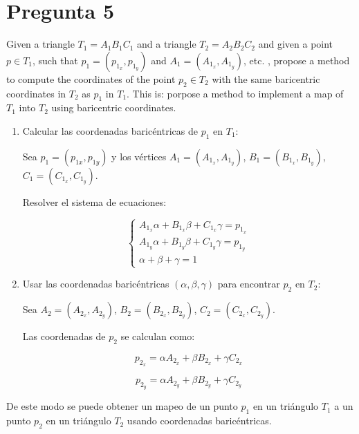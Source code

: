 \documentclass{article}
\begin{document}
\begin{itemize}
\end{itemize}

\section{Pregunta 5}

Given a triangle $T_1 = A_1 B_1 C_1$ and a triangle $T_2 = A_2 B_2 C_2$ and given a point $p \in T_1$, such that $p_1 = (p_{1_x}, p_{1_y})$ and $A_1 = (A_{1_x}, A_{1_y})$, etc. , propose a method to compute the coordinates of the point $p_2 \in T_2$ with the same baricentric coordinates in $T_2$ as $p_1$ in $T_1$. This is: porpose a method to implement a map of $T_1$ into $T_2$ using baricentric coordinates.


\begin{enumerate}
    \item Calcular las coordenadas baricéntricas de \( p_1 \) en \( T_1 \):

    Sea \( p_1 = (p_{1x}, p_{1y}) \) y los vértices \( A_1 = (A_{1_x}, A_{1_y}) \), \( B_1 = (B_{1_x}, B_{1_y}) \), \( C_1 = (C_{1_x}, C_{1_y}) \).

    Resolver el sistema de ecuaciones:

    \[
    \begin{cases}
    A_{1_x} \alpha + B_{1_x} \beta + C_{1_x} \gamma = p_{1_x} \\
    A_{1_y} \alpha + B_{1_y} \beta + C_{1_y} \gamma = p_{1_y} \\
    \alpha + \beta + \gamma = 1
    \end{cases}
    \]

    \item Usar las coordenadas baricéntricas \((\alpha, \beta, \gamma)\) para encontrar \( p_2 \) en \( T_2 \):

    Sea \( A_2 = (A_{2_x}, A_{2_y}) \), \( B_2 = (B_{2_x}, B_{2_y}) \), \( C_2 = (C_{2_x}, C_{2_y}) \).

    Las coordenadas de \( p_2 \) se calculan como:

    \[
    p_{2_x} = \alpha A_{2_x} + \beta B_{2_x} + \gamma C_{2_x}
    \]

    \[
    p_{2_y} = \alpha A_{2_y} + \beta B_{2_y} + \gamma C_{2_y}
    \]
\end{enumerate}

De este modo se puede obtener un mapeo de un punto \( p_1 \) en un triángulo \( T_1 \) a un punto \( p_2 \) en un triángulo \( T_2 \) usando coordenadas baricéntricas.
\end{document}
